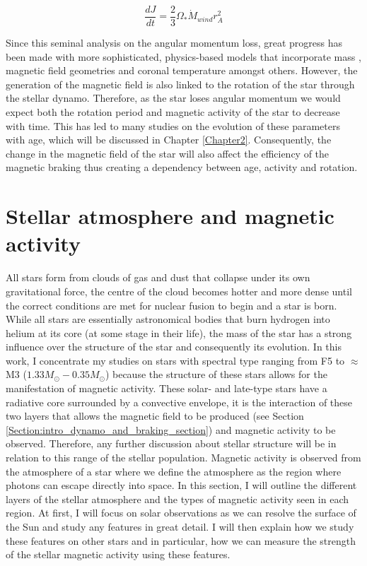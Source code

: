 \begin{equation}
    \frac{dJ}{dt} = \frac{2}{3}\Omega_{*}\dot{M}_{wind}r_{A}^{2}
    \label{Eq:WD67_mag_braking}
\end{equation}

Since this seminal analysis on the angular momentum loss, great progress has been made with more sophisticated, physics-based models that incorporate mass \citep{Matt_etal_2015}, magnetic field geometries \citep{Finley_etal_2017,Garraffo_etal_2018} and coronal temperature \citep{Pantolmos_etal_2017} amongst others. However, the generation of the magnetic field is also linked to the rotation of the star through the stellar dynamo. Therefore, as the star loses angular momentum we would expect both the rotation period and magnetic activity of the star to decrease with time. This has led to many studies on the evolution of these parameters with age, which will be discussed in Chapter \ref{Chapter2}. Consequently, the change in the magnetic field of the star will also affect the efficiency of the magnetic braking thus creating a dependency between age, activity and rotation.

\section{Stellar atmosphere and magnetic activity}
\label{Section:intro_stellar_structure}

All stars form from clouds of gas and dust that collapse under its own gravitational force, the centre of the cloud becomes hotter and more dense until the correct conditions are met for nuclear fusion to begin and a star is born. While all stars are essentially astronomical bodies that burn hydrogen into helium at its core (at some stage in their life), the mass of the star has a strong influence over the structure of the star and consequently its evolution. In this work, I concentrate my studies on stars with spectral type ranging from F5 to $\approx$ M3 ($1.33 M_{\odot} - 0.35 M_{\odot}$) because the structure of these stars allows for the manifestation of magnetic activity. These solar- and late-type stars have a radiative core surrounded by a convective envelope, it is the interaction of these two layers that allows the magnetic field to be produced (see Section \ref{Section:intro_dynamo_and_braking_section}) and magnetic activity to be observed. Therefore, any further discussion about stellar structure will be in relation to this range of the stellar population. Magnetic activity is observed from the atmosphere of a star where we define the atmosphere as the region where photons can escape directly into space. In this section, I will outline the different layers of the stellar atmosphere and the types of magnetic activity seen in each region. At first, I will focus on solar observations as we can resolve the surface of the Sun and study any features in great detail. I will then explain how we study these features on other stars and in particular, how we can measure the strength of the stellar magnetic activity using these features.

